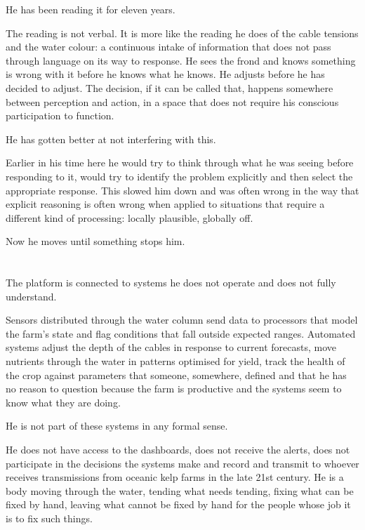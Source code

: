 He has been reading it for eleven years.

The reading is not verbal. It is more like the reading
he does of the cable tensions and the water colour:
a continuous intake of information that does not pass
through language on its way to response. He sees the
frond and knows something is wrong with it before he
knows what he knows. He adjusts before he has decided
to adjust. The decision, if it can be called that,
happens somewhere between perception and action,
in a space that does not require his conscious
participation to function.

He has gotten better at not interfering with this.

Earlier in his time here he would try to think through
what he was seeing before responding to it, would
try to identify the problem explicitly and then select
the appropriate response. This slowed him down and
was often wrong in the way that explicit reasoning
is often wrong when applied to situations that require
a different kind of processing: locally plausible,
globally off.

Now he moves until something stops him.

\section{}

The platform is connected to systems he does not
operate and does not fully understand.

Sensors distributed through the water column send
data to processors that model the farm's state and
flag conditions that fall outside expected ranges.
Automated systems adjust the depth of the cables
in response to current forecasts, move nutrients
through the water in patterns optimised for yield,
track the health of the crop against parameters
that someone, somewhere, defined and that he has
no reason to question because the farm is productive
and the systems seem to know what they are doing.

He is not part of these systems in any formal sense.

He does not have access to the dashboards, does not
receive the alerts, does not participate in the
decisions the systems make and record and transmit
to whoever receives transmissions from oceanic kelp
farms in the late 21st century. He is a body moving
through the water, tending what needs tending,
fixing what can be fixed by hand, leaving what
cannot be fixed by hand for the people whose job
it is to fix such things.

